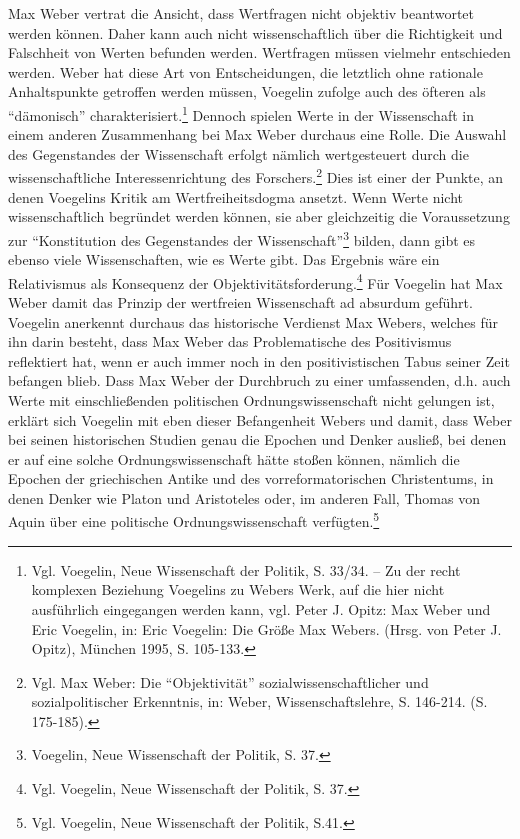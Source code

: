 Max Weber vertrat die Ansicht, dass Wertfragen nicht objektiv beantwortet
werden können. Daher kann auch nicht wissenschaftlich über die Richtigkeit und
Falschheit von Werten befunden werden. Wertfragen müssen vielmehr entschieden
werden. Weber hat diese Art von Entscheidungen, die letztlich ohne rationale
Anhaltspunkte getroffen werden müssen, Voegelin zufolge auch des öfteren als
"`dämonisch"' charakterisiert.\footnote{Vgl. Voegelin, Neue Wissenschaft der
  Politik, S. 33/34. -- Zu der recht komplexen Beziehung Voegelins zu Webers
  Werk, auf die hier nicht ausführlich eingegangen werden kann, vgl. Peter J.
  Opitz: Max Weber und Eric Voegelin, in: Eric Voegelin: Die Größe Max Webers.
  (Hrsg. von Peter J.  Opitz), München 1995, S. 105-133.} Dennoch spielen Werte
in der Wissenschaft in einem anderen Zusammenhang bei Max Weber durchaus eine
Rolle.  Die Auswahl des Gegenstandes der Wissenschaft erfolgt nämlich
wertgesteuert durch die wissenschaftliche Interessenrichtung des
Forschers.\footnote{Vgl.  Max Weber: Die "`Objektivität"'
  sozialwissenschaftlicher und sozialpolitischer Erkenntnis, in: Weber,
  Wissenschaftslehre, S. 146-214.  (S. 175-185).} Dies ist einer der Punkte, an
denen Voegelins Kritik am Wertfreiheitsdogma ansetzt.  Wenn Werte nicht
wissenschaftlich begründet werden können, sie aber gleichzeitig die
Voraussetzung zur "`Konstitution des Gegenstandes der
Wissenschaft"'\footnote{Voegelin, Neue Wissenschaft der Politik, S. 37.}
bilden, dann gibt es ebenso viele Wissenschaften, wie es Werte gibt. Das
Ergebnis wäre ein Relativismus als Konsequenz der
Objektivitätsforderung.\footnote{Vgl.  Voegelin, Neue Wissenschaft der
  Politik, S. 37.} Für Voegelin hat Max Weber damit das Prinzip der wertfreien
Wissenschaft ad absurdum geführt. Voegelin anerkennt durchaus das historische
Verdienst Max Webers, welches für ihn darin besteht, dass Max Weber das
Problematische des Positivismus reflektiert hat, wenn er auch immer noch in
den positivistischen Tabus seiner Zeit befangen blieb. Dass Max Weber der
Durchbruch zu einer umfassenden, d.h. auch Werte mit einschließenden
politischen Ordnungswissenschaft nicht gelungen ist, erklärt sich Voegelin mit
eben dieser Befangenheit Webers und damit, dass Weber bei seinen historischen
Studien genau die Epochen und Denker ausließ, bei denen er auf eine solche
Ordnungswissenschaft hätte stoßen können, nämlich die Epochen der griechischen
Antike und des vorreformatorischen Christentums, in denen Denker wie Platon
und Aristoteles oder, im anderen Fall, Thomas von Aquin über eine politische
Ordnungswissenschaft verfügten.\footnote{Vgl.  Voegelin, Neue Wissenschaft der
  Politik, S.41.}

